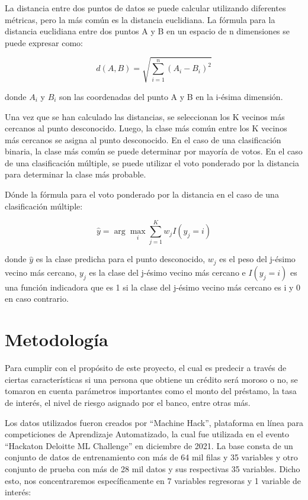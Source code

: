 \documentclass[a4paper,12pt]{article}
\begin{document}
La distancia entre dos puntos de datos se puede calcular utilizando diferentes métricas, pero la más común es la distancia euclidiana. La fórmula para la distancia euclidiana entre dos puntos A y B en un espacio de n dimensiones se puede expresar como:

$$d(A,B)=\sqrt{\sum_{i=1}^{n}(A_{i}-B_{i})^{2}}$$

donde $A_{i}$ y $B_{i}$ son las coordenadas del punto A y B en la i-ésima dimensión.

Una vez que se han calculado las distancias, se seleccionan los K vecinos más cercanos al punto desconocido. Luego, la clase más común entre los K vecinos más cercanos se asigna al punto desconocido. En el caso de una clasificación binaria, la clase más común se puede determinar por mayoría de votos. En el caso de una clasificación múltiple, se puede utilizar el voto ponderado por la distancia para determinar la clase más probable.

Dónde la fórmula para el voto ponderado por la distancia en el caso de una clasificación múltiple:

$$\hat{y} = \arg\max_{i}\sum_{j=1}^{K}w_{j}I(y_{j}=i)$$

donde $\hat{y}$ es la clase predicha para el punto desconocido, $w_{j}$ es el peso del j-ésimo vecino más cercano, $y_{j}$ es la clase del j-ésimo vecino más cercano e $I(y_{j}=i)$ es una función indicadora que es 1 si la clase del j-ésimo vecino más cercano es i y 0 en caso contrario.

\section{Metodología}

Para cumplir con el propósito de este proyecto, el cual es predecir a través de ciertas características si una persona que obtiene un crédito será moroso o no, se tomaron en cuenta parámetros importantes como el monto del préstamo, la tasa de interés, el nivel de riesgo asignado por el banco, entre otras más. 

Los datos utilizados fueron creados por ``Machine Hack'', plataforma en línea para competiciones de Aprendizaje Automatizado, la cual fue utilizada en el evento ``Hackaton Deloitte ML Challenge'' en diciembre de 2021. La base consta de un conjunto de datos de entrenamiento con más de 64 mil filas y 35 variables y otro conjunto de prueba con más de 28 mil datos y sus respectivas 35 variables. Dicho esto, nos concentraremos específicamente en 7 variables regresoras y 1 variable de interés:
\end{document}
